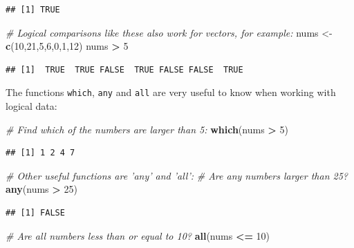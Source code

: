 \documentclass[]{book}
\newenvironment{Shaded}{\begin{snugshade}}{\end{snugshade}}
\newcommand{\CommentTok}[1]{\textcolor[rgb]{0.56,0.35,0.01}{\textit{#1}}}
\newcommand{\DecValTok}[1]{\textcolor[rgb]{0.00,0.00,0.81}{#1}}
\newcommand{\KeywordTok}[1]{\textcolor[rgb]{0.13,0.29,0.53}{\textbf{#1}}}
\newcommand{\NormalTok}[1]{#1}
\newcommand{\OperatorTok}[1]{\textcolor[rgb]{0.81,0.36,0.00}{\textbf{#1}}}
\newcommand{\StringTok}[1]{\textcolor[rgb]{0.31,0.60,0.02}{#1}}
\begin{document}
\begin{verbatim}
## [1] TRUE
\end{verbatim}

\begin{Shaded}
\begin{Highlighting}[]
\CommentTok{# Logical comparisons like these also work for vectors, for example:}
\NormalTok{nums <-}\StringTok{ }\KeywordTok{c}\NormalTok{(}\DecValTok{10}\NormalTok{,}\DecValTok{21}\NormalTok{,}\DecValTok{5}\NormalTok{,}\DecValTok{6}\NormalTok{,}\DecValTok{0}\NormalTok{,}\DecValTok{1}\NormalTok{,}\DecValTok{12}\NormalTok{)}
\NormalTok{nums }\OperatorTok{>}\StringTok{ }\DecValTok{5}
\end{Highlighting}
\end{Shaded}

\begin{verbatim}
## [1]  TRUE  TRUE FALSE  TRUE FALSE FALSE  TRUE
\end{verbatim}

The functions \texttt{which}, \texttt{any} and \texttt{all} are very useful to know when working with logical data:

\begin{Shaded}
\begin{Highlighting}[]
\CommentTok{# Find which of the numbers are larger than 5:}
\KeywordTok{which}\NormalTok{(nums }\OperatorTok{>}\StringTok{ }\DecValTok{5}\NormalTok{)}
\end{Highlighting}
\end{Shaded}

\begin{verbatim}
## [1] 1 2 4 7
\end{verbatim}

\begin{Shaded}
\begin{Highlighting}[]
\CommentTok{# Other useful functions are 'any' and 'all':}
\CommentTok{# Are any numbers larger than 25?}
\KeywordTok{any}\NormalTok{(nums }\OperatorTok{>}\StringTok{ }\DecValTok{25}\NormalTok{)}
\end{Highlighting}
\end{Shaded}

\begin{verbatim}
## [1] FALSE
\end{verbatim}

\begin{Shaded}
\begin{Highlighting}[]
\CommentTok{# Are all numbers less than or equal to 10?}
\KeywordTok{all}\NormalTok{(nums }\OperatorTok{<=}\StringTok{ }\DecValTok{10}\NormalTok{)}
\end{Highlighting}
\end{Shaded}
\end{document}
